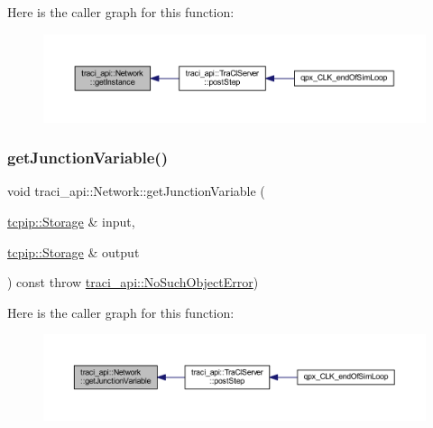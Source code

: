 Here is the caller graph for this function\+:
\nopagebreak
\begin{figure}[H]
\begin{center}
\leavevmode
\includegraphics[width=350pt]{classtraci__api_1_1_network_ab6c12d9fa0affbeeb0d068544adb4724_icgraph}
\end{center}
\end{figure}
\mbox{\label{classtraci__api_1_1_network_a9bfe4236d1ab692d47133c69406811b3}} 
\subsubsection{\texorpdfstring{get\+Junction\+Variable()}{getJunctionVariable()}}
{\footnotesize\ttfamily void traci\+\_\+api\+::\+Network\+::get\+Junction\+Variable (\begin{DoxyParamCaption}\item[{\hyperlink{classtcpip_1_1_storage}{tcpip\+::\+Storage} \&}]{input,  }\item[{\hyperlink{classtcpip_1_1_storage}{tcpip\+::\+Storage} \&}]{output }\end{DoxyParamCaption}) const throw  \hyperlink{classtraci__api_1_1_no_such_object_error}{traci\+\_\+api\+::\+No\+Such\+Object\+Error}) }

Here is the caller graph for this function\+:
\nopagebreak
\begin{figure}[H]
\begin{center}
\leavevmode
\includegraphics[width=350pt]{classtraci__api_1_1_network_a9bfe4236d1ab692d47133c69406811b3_icgraph}
\end{center}
\end{figure}
\mbox{\label{classtraci__api_1_1_network_a8a82aa15b0422ce28ca240e88c1af4f7}} 

